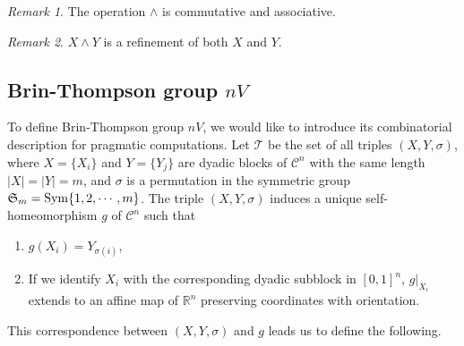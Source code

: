 \documentclass[12pt,reqno]{amsart}
\theoremstyle{plain}
\theoremstyle{definition}
\theoremstyle{remark}
\newtheorem{remark}{Remark}[section]
\numberwithin{equation}{section}
\begin{document}
\begin{remark} 
	The operation  $\wedge$  is commutative and associative.  
\end{remark} 	

\begin{remark}\label{Rm:CommonRefinement}  
	$X \wedge Y$  is a refinement of both  $X$  and  $Y$.  
\end{remark} 


\medskip 
\subsection{Brin-Thompson group  $nV$} 

To define Brin-Thompson group  $nV$,  
we would like to introduce its combinatorial description for pragmatic computations.     
Let  $\mathcal{T}$  be the set of all triples  $(X, Y, \sigma)$, 
where  $X = \{ X_i \}$  and  $Y = \{ Y_j \}$  are dyadic blocks of  $\mathcal{C}^n$  
with the same length  $|X| = |Y| = m$,   
and  $\sigma$  is a permutation in 
the symmetric group $\mathfrak{S}_m = {\rm Sym} \{ 1, 2, \cdots, m \}$. 
The triple  $(X, Y, \sigma)$  induces a unique self-homeomorphism  $g$
of  $\mathcal{C}^n $ 
such that 
\begin{enumerate} 
\item 
	$g(X_i) = Y_{\sigma (i)}$, 
\item 
	If we identify  $X_i$  with the corresponding dyadic subblock in  $[0, 1]^n$, 
	$g|_{X_i}$  extends to an affine map of  $\mathbb{R}^n$  preserving coordinates with orientation.  
\end{enumerate} 
This correspondence between  $(X, Y, \sigma)$  and  $g$  leads us to define the following.  
\end{document}
